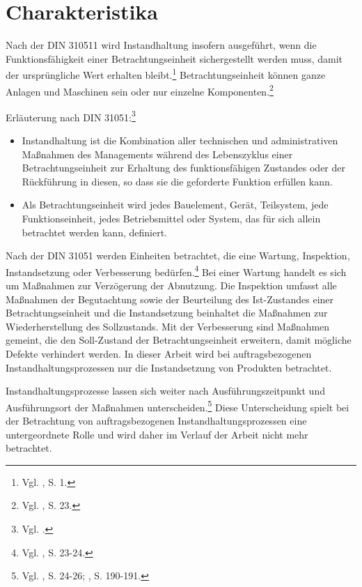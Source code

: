 \section{Charakteristika}

Nach der DIN 310511 wird Instandhaltung insofern ausgeführt, wenn die Funktionsfähigkeit einer Betrachtungseinheit sichergestellt werden muss, damit der ursprüngliche Wert erhalten bleibt.\footnote{Vgl. \cite{Strunz:2012aa}, S. 1.} Betrachtungseinheit können ganze Anlagen und Maschinen sein oder nur einzelne Komponenten.\footnote{Vgl. \cite{schenk2010techSys}, S. 23.}

Erläuterung nach DIN 31051:\footnote{Vgl. \cite{DIN}.}
\begin{itemize}
\item Instandhaltung ist die Kombination aller technischen und administrativen Maßnahmen des Managements während des Lebenszyklus einer Betrachtungseinheit zur Erhaltung des funktionsfähigen Zustandes oder der Rückführung in diesen, so dass sie die geforderte Funktion erfüllen kann.
\item Als Betrachtungseinheit wird jedes Bauelement, Gerät, Teilsystem, jede Funktionseinheit, jedes Betriebsmittel oder System, das für sich allein betrachtet werden kann, definiert.
\end{itemize}

Nach der DIN 31051 werden Einheiten betrachtet, die eine Wartung, Inspektion, Instandsetzung oder Verbesserung bedürfen.\footnote{Vgl. \cite{schenk2010techSys}, S. 23-24.} Bei einer Wartung handelt es sich um Maßnahmen zur Verzögerung der Abnutzung. Die Inspektion umfasst alle Maßnahmen der Begutachtung sowie der Beurteilung des Ist-Zustandes einer Betrachtungseinheit und die Instandsetzung beinhaltet die Maßnahmen zur Wiederherstellung des Sollzustands. Mit der Verbesserung sind Maßnahmen gemeint, die den Soll-Zustand der Betrachtungseinheit erweitern, damit mögliche Defekte verhindert werden. In dieser Arbeit wird bei auftragsbezogenen Instandhaltungsprozessen nur die Instandsetzung von Produkten betrachtet.

Instandhaltungsprozesse lassen sich weiter nach Ausführungszeitpunkt und Ausführungsort der Maßnahmen unterscheiden.\footnote{Vgl. \cite{schenk2010techSys}, S. 24-26; \cite{hinsch2010instandhaltung}, S. 190-191.} Diese Unterscheidung spielt bei der Betrachtung von auftragsbezogenen Instandhaltungsprozessen eine untergeordnete Rolle und wird daher im Verlauf der Arbeit nicht mehr betrachtet.


